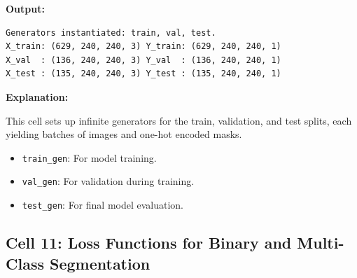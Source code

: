 \noindent\textbf{Output:}
\begin{lstlisting}[style=output]
Generators instantiated: train, val, test.
X_train: (629, 240, 240, 3) Y_train: (629, 240, 240, 1)
X_val  : (136, 240, 240, 3) Y_val  : (136, 240, 240, 1)
X_test : (135, 240, 240, 3) Y_test : (135, 240, 240, 1)
\end{lstlisting}

\noindent\textbf{Explanation:}

This cell sets up infinite generators for the train, validation, and test splits, each yielding batches of images and one-hot encoded masks.
\begin{itemize}
    \item \texttt{train\_gen}: For model training.
    \item \texttt{val\_gen}: For validation during training.
    \item \texttt{test\_gen}: For final model evaluation.
\end{itemize}


\subsection{Cell 11: Loss Functions for Binary and Multi-Class Segmentation}

